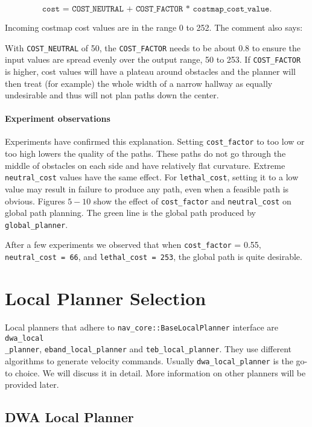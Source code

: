 \documentclass[12pt]{article}
\begin{document}
$$\texttt{cost = COST\_NEUTRAL + COST\_FACTOR * costmap\_cost\_value.}$$

Incoming costmap cost values are in the range 0 to 252. The comment also says:
\begin{displayquote}
    With \texttt{COST\_NEUTRAL} of 50, the \texttt{COST\_FACTOR} needs to be about 0.8 to
    ensure the input values are spread evenly over the output range, 50
    to 253.  If \texttt{COST\_FACTOR} is higher, cost values will have a plateau
    around obstacles and the planner will then treat (for example) the
    whole width of a narrow hallway as equally undesirable and thus
    will not plan paths down the center.
\end{displayquote}

\paragraph{Experiment observations} Experiments have confirmed this explanation. Setting \texttt{cost\_factor} to too low or too high lowers
the quality of the paths. These paths do not go through the middle of obstacles on each side and have relatively flat curvature. Extreme
\texttt{neutral\_cost} values have the same effect. For \texttt{lethal\_cost}, setting it to a low value may result
in failure to produce any path, even when a feasible path is obvious. Figures $5-10$ show the effect of \texttt{cost\_factor} and \texttt{neutral\_cost} on global path planning. The green line is the global path produced by \texttt{global\_planner}.

After a few experiments we observed that when \texttt{cost\_factor} = 0.55, \texttt{neutral\_cost = 66}, and \texttt{lethal\_cost = 253}, the global path is quite desirable.

\section{Local Planner Selection}

Local planners that adhere to \texttt{nav\_core::BaseLocalPlanner} interface are \texttt{dwa\_local\\\_planner}, \texttt{eband\_local\_planner} and \texttt{teb\_local\_planner}.
They use different algorithms to generate velocity commands. Usually \texttt{dwa\_local\_planner} is the go-to choice. We will discuss it in detail. More
information on other planners will be provided later.

\subsection{DWA Local Planner}
\end{document}

